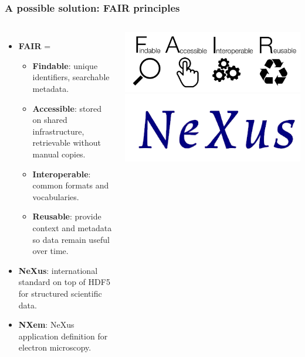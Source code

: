 \documentclass{beamer}
\begin{document}
	
	
	\begin{frame}
		\frametitle{A possible solution: FAIR principles}
		\begin{columns}[T,totalwidth=\textwidth]
			\begin{itemize}
				\item \textbf{FAIR} = 
				\begin{itemize}
					\item \textbf{Findable}: unique identifiers, searchable metadata.  
					\item \textbf{Accessible}: stored on shared infrastructure, retrievable without manual copies.    
					\item \textbf{Interoperable}: common formats and vocabularies.  
					\item \textbf{Reusable}: provide context and metadata so data remain useful over time.
				\end{itemize}
				\item \textbf{NeXus}: international standard on top of HDF5 for structured scientific data.
				\item \textbf{NXem}: NeXus application definition for electron microscopy.
			\end{itemize}
			\includegraphics[width=\linewidth]{otherResources/FAIR_data_principles.png}\\[0.5em]
			\includegraphics[width=\linewidth]{otherResources/NEXUS_logo.png}
		\end{columns}
	\end{frame}
	
\end{document}
